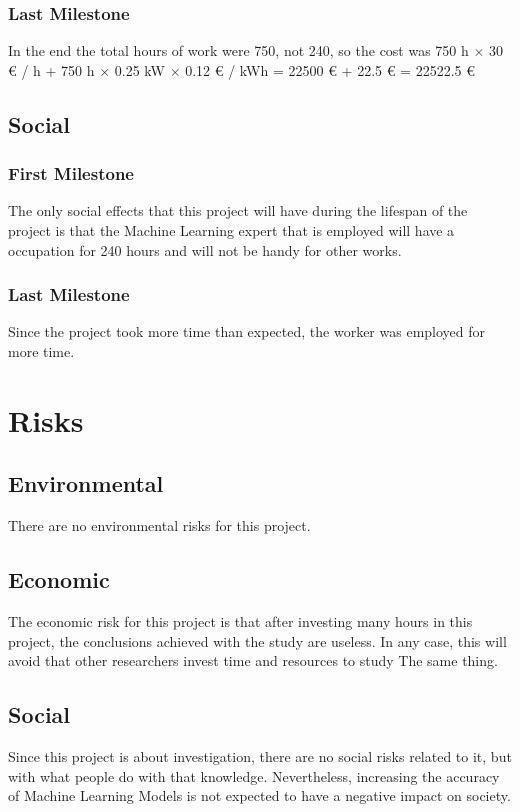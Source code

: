       \subsubsection*{Last Milestone}

      In the end the total hours of work were 750, not 240, so the
      cost was 750 h $\times$ 30 € / h + 750 h $\times$ 0.25 kW $\times$ 0.12
      € / kWh = 22500 € + 22.5 € = 22522.5 €
    \subsection{Social}
      \subsubsection*{First Milestone}

      The only social effects that this project will have during the lifespan
      of the project is that the Machine Learning expert that is employed
      will have a occupation for 240 hours and will not be handy for other
      works.

      \subsubsection*{Last Milestone}

      Since the project took more time than expected, the worker was employed
      for more time.

    \section{Risks}
      \subsection{Environmental}
        There are no environmental risks for this project.

      \subsection{Economic}

      The economic risk for this project is that after investing many
      hours in this project, the conclusions achieved with the study
      are useless. In any case, this will avoid that other researchers
      invest time and resources to study The same thing.

      \subsection{Social}

      Since this project is about investigation, there are no social risks
      related to it, but with what people do with that knowledge.
      Nevertheless, increasing the accuracy of Machine Learning Models
      is not expected to have a negative impact on society.

